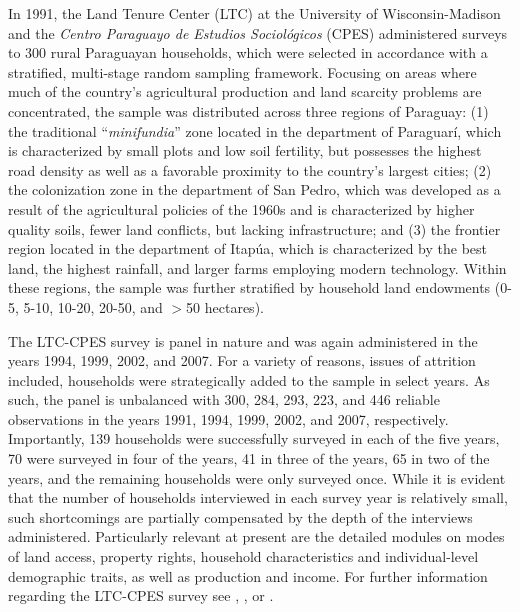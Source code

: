 \documentclass[english]{article}
\begin{document}
In 1991, the Land Tenure Center (LTC) at the University of 
Wisconsin-Madison and the \emph{Centro Paraguayo de Estudios 
Sociol\'{o}gicos} (CPES) administered surveys to 300 rural Paraguayan 
households, which were selected in accordance with a stratified, multi-stage 
random sampling framework. 
Focusing on areas where much of the country's agricultural production and 
land scarcity problems are concentrated, the sample was distributed across three 
regions of Paraguay: (1) the traditional ``\emph{minifundia}'' zone located in 
the department of Paraguar\'{i}, which is characterized by small plots and low 
soil fertility, but possesses the highest road density as well as a favorable 
proximity to the country's largest cities; (2) the colonization zone in the 
department of San Pedro, which was developed as a result of the agricultural 
policies of the 1960s and is characterized by higher quality soils, fewer land 
conflicts, but lacking infrastructure; and (3) the frontier region located in the 
department of Itap\'{u}a, which is characterized by the best land, the highest 
rainfall, and larger farms employing modern technology. 
Within these regions, the sample was further stratified by household land 
endowments (0-5, 5-10, 10-20, 20-50, and $>$50 hectares).

The LTC-CPES survey is panel in nature and was again administered in the 
years 1994, 1999, 2002, and 2007. 
For a variety of reasons, issues of attrition included, households were 
strategically added to the sample in select years.
As such, the panel is unbalanced with 300, 284, 293, 223, and 446 reliable 
observations in the years 1991, 1994, 1999, 2002, and 2007, respectively. 
Importantly, 139 households were successfully surveyed in each of the five 
years, 70 were surveyed in four of the years, 41 in three of the years, 65 in two 
of the years, and the remaining households were only surveyed once. 
While it is evident that the number of households interviewed in each survey 
year is relatively small, such shortcomings are partially compensated by the 
depth of the interviews administered. 
Particularly relevant at present are the detailed modules on modes of land 
access, property rights, household characteristics and individual-level 
demographic traits, as well as production and income. 
For further information regarding the LTC-CPES survey see 
\citet{fletschner2002}, \citet{carter2003}, or \citet{schechter2007}.

\end{document}
